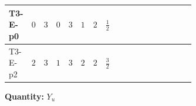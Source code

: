 \documentclass[8pt]{article}
\begin{document}
\begin{landscape}
\begin{longtable}{@{}llcccccc >{\raggedright\arraybackslash}p{0.21\linewidth} >{\raggedright\arraybackslash}p{0.21\linewidth} >{\raggedright\arraybackslash}p{0.21\linewidth}@{}}
T3-E-p0 & $0$ & $3$ & $0$ & $3$ & $1$ & $2$ & $\frac{1}{2}$ & \scriptsize\adjustbox{max width=\linewidth}{$\begin{gathered} -\frac{3}{2} (\left({Y_d}\,\left({Y_d}\right)^{\dagger}\,{Y_u}\right)_{ij}-\left({Y_u}\,\left({Y_u}\right)^{\dagger}\,{Y_u}\right)_{ij})\end{gathered}$} & \scriptsize\adjustbox{max width=\linewidth}{$\begin{gathered} -\frac{9}{4} {g_2}^2 \left({Y_u}\right)_{ij}\end{gathered}$} & \scriptsize\adjustbox{max width=\linewidth}{$\begin{gathered} -8 {g_3}^2 \left({Y_u}\right)_{ij}\end{gathered}$} \\
\midrule
T3-E-p2 & $2$ & $3$ & $1$ & $3$ & $2$ & $2$ & $\frac{3}{2}$ & \scriptsize\adjustbox{max width=\linewidth}{$\begin{gathered} -\frac{3}{2} (\left({Y_d}\,\left({Y_d}\right)^{\dagger}\,{Y_u}\right)_{ij}-\left({Y_u}\,\left({Y_u}\right)^{\dagger}\,{Y_u}\right)_{ij})\end{gathered}$} & \scriptsize\adjustbox{max width=\linewidth}{$\begin{gathered} -\frac{9}{4} {g_2}^2 \left({Y_u}\right)_{ij}\end{gathered}$} & \scriptsize\adjustbox{max width=\linewidth}{$\begin{gathered} -8 {g_3}^2 \left({Y_u}\right)_{ij}\end{gathered}$} \\
\midrule
\bottomrule
\end{longtable}
\clearpage
\noindent\textbf{Quantity: }$Y_u$\par\smallskip

\end{landscape}
\end{document}
